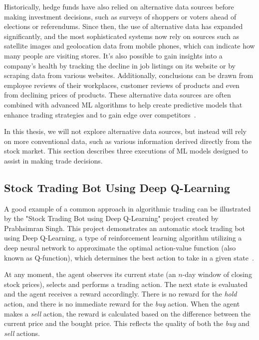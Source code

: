 \documentclass[a4paper,oneside,onecolumn,12pt]{book}
\begin{document}
	Historically, hedge funds have also relied on alternative data sources before making investment decisions, such as surveys of shoppers or voters ahead of elections or referendums. Since then, the use of alternative data has expanded significantly, and the most sophisticated systems now rely on sources such as satellite images and geolocation data from mobile phones, which can indicate how many people are visiting stores. It's also possible to gain insights into a company's health by tracking the decline in job listings on its website or by scraping data from various websites. Additionally, conclusions can be drawn from employee reviews of their workplaces, customer reviews of products and even from declining prices of products. These alternative data sources are often combined with advanced ML algorithms to help create predictive models that enhance trading strategies and to gain edge over competitors~\cite{MLAT}.

	In this thesis, we will not explore alternative data sources, but instead will rely on more conventional data, such as various information derived directly from the stock market. This section describes three executions of ML models designed to assist in making trade decisions.

	\subsection{Stock Trading Bot Using Deep Q-Learning~\cite{STBDQ}}
	A good example of a common approach in algorithmic trading can be illustrated by the "Stock Trading Bot using Deep Q-Learning" project created by Prabhsimran Singh. This project demonstrates an automatic stock trading bot using Deep Q-Learning, a type of reinforcement learning algorithm utilizing a deep neural network to approximate the optimal action-value function (also known as Q-function), which determines the best action to take in a given state~\cite{HCTDRL}.

	At any moment, the agent observes its current state (an $n$-day window of closing stock prices), selects and performs a trading action. The next state is evaluated and the agent receives a reward accordingly. There is no reward for the \textit{hold} action, and there is no immediate reward for the \textit{buy} action. When the agent makes a \textit{sell} action, the reward is calculated based on the difference between the current price and the bought price. This reflects the quality of both the \textit{buy} and \textit{sell} actions.
\end{document}

